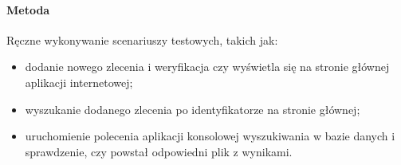 




            \paragraph{Metoda}
            Ręczne wykonywanie scenariuszy testowych, takich jak:
            \begin{itemize}
                \item {dodanie nowego zlecenia i weryfikacja czy wyświetla się na stronie głównej aplikacji internetowej;}
                \item {wyszukanie dodanego zlecenia po identyfikatorze na stronie głównej;}
                \item {uruchomienie polecenia aplikacji konsolowej wyszukiwania w bazie danych i sprawdzenie, czy powstał odpowiedni plik z wynikami.}
            \end{itemize}

